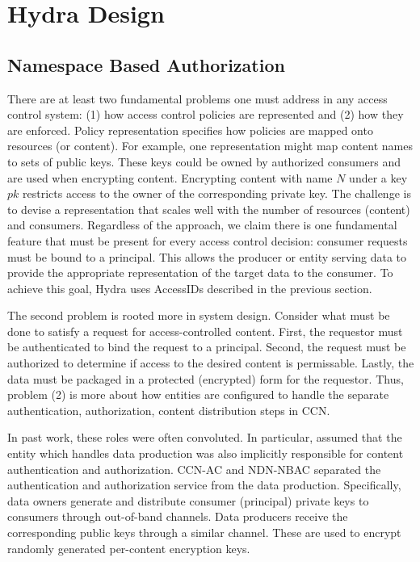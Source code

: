 \section{Hydra Design}

\subsection{Namespace Based Authorization}

There are at least two fundamental problems one must address in any access control
system: (1) how access control policies are represented and (2) how they are enforced.
Policy representation specifies how policies are mapped onto resources (or content).
For example, one representation might map content names to sets of public keys. These
keys could be owned by authorized consumers and are used when encrypting content.
Encrypting content with name $N$ under a key $pk$ restricts access to the owner of
the corresponding private key. The challenge is to devise a representation that
scales well with the number of resources (content) and consumers. Regardless of
the approach, we claim there is one fundamental feature that must be present for
every access control decision: consumer requests must be bound to a principal.
This allows the producer or entity serving data to provide the appropriate
representation of the target data to the consumer. To achieve this goal, Hydra
uses AccessIDs described in the previous section.

The second problem is rooted more in system design. Consider what must be done
to satisfy a request for access-controlled content. First, the requestor must
be authenticated to bind the request to a principal. Second, the request must
be authorized to determine if access to the desired content is permissable. Lastly,
the data must be packaged in a protected (encrypted) form for the requestor. Thus,
problem (2) is more about how entities are configured to handle the separate
authentication, authorization, content distribution steps in CCN.

In past work, these roles were often convoluted. In particular, \cite{pre,be}
assumed that the entity which handles data production was also implicitly
responsible for content authentication and authorization. CCN-AC \cite{xx} and
NDN-NBAC \cite{xx} separated the authentication and authorization service from
the data production. Specifically, data owners generate and distribute consumer (principal)
private keys to consumers through out-of-band channels. Data producers receive
the corresponding public keys through a similar channel. These are used to encrypt
randomly generated per-content encryption keys.

